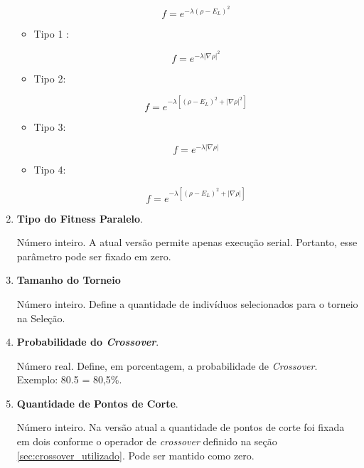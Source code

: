\begin{enumerate}
\begin{itemize}
					\begin{equation}
					f = e^{-\lambda(\rho - E_L)^2}
					\end{equation}
				
				\item Tipo 1 \cite{metodo2004}:
				
					\begin{equation}
					f = e^{-\lambda |\nabla \rho|^2}
					\end{equation}
					
				\item Tipo 2:
				
					\begin{equation}
					f = e^{-\lambda [(\rho - E_L)^2 + |\nabla \rho|^2]}
					\end{equation}
					
				\item Tipo 3:
				
					\begin{equation}
					f = e^{-\lambda |\nabla \rho|}
					\end{equation}
		
			\item Tipo 4:
				
					\begin{equation}
					f = e^{-\lambda [(\rho - E_L)^2 + |\nabla \rho|]}
					\end{equation}
			\end{itemize}
			
		\item \textbf{Tipo do Fitness Paralelo}.
		
				Número inteiro. A atual versão permite apenas execução serial. Portanto, esse parâmetro pode ser fixado em zero.
		
		\item \textbf{Tamanho do Torneio}
		
			Número inteiro. Define a quantidade de indivíduos selecionados para o torneio na Seleção.
		
		\item \textbf{Probabilidade do \emph{Crossover}}.
		
			Número real. Define, em porcentagem, a probabilidade de \emph{Crossover}. Exemplo: 80.5 = 80,5\%.
		
		\item \textbf{Quantidade de Pontos de Corte}.
		
			Número inteiro. Na versão atual a quantidade de pontos de corte foi fixada em dois conforme o operador de \emph{crossover} definido na seção \ref{sec:crossover_utilizado}. Pode ser mantido como zero.
		

\end{enumerate}
